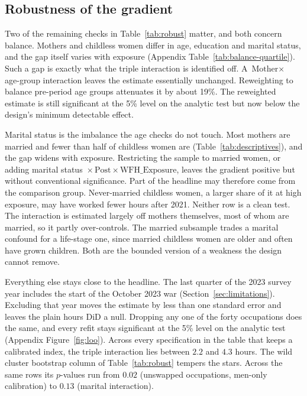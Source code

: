 \documentclass[12pt,a4paper]{article}
\newcommand{\Mother}{\text{Mother}}
\newcommand{\Post}{\text{Post}}
\newcommand{\WFH}{\text{WFH\_Exposure}}
\begin{document}
\subsection{Robustness of the gradient}\label{sec:res-robust}

Two of the remaining checks in Table~\ref{tab:robust} matter, and both concern balance. Mothers
and childless women differ in age, education and marital status, and the gap itself varies with
exposure (Appendix Table~\ref{tab:balance-quartile}). Such a gap is exactly what the triple
interaction is identified off. A $\Mother \times {}$ age-group interaction leaves the estimate
essentially unchanged. Reweighting to balance pre-period age groups attenuates it by about 19\%.
The reweighted estimate is still significant at the 5\% level on the analytic test but now below
the design's minimum detectable effect.

\noindent Marital status is the imbalance the age checks do not touch. Most mothers are married and fewer
than half of childless women are (Table~\ref{tab:descriptives}), and the gap widens with
exposure. Restricting the sample to married women, or adding marital status ${} \times \Post \times
\WFH$, leaves the gradient positive but without conventional significance. Part of the headline
may therefore come from the comparison group. Never-married childless women, a larger share of it
at high exposure, may have worked fewer hours after 2021. Neither row is a clean test. The
interaction is estimated largely off mothers themselves, most of whom are married, so it partly
over-controls. The married subsample trades a marital confound for a life-stage one, since
married childless women are older and often have grown children. Both are the bounded version of
a weakness the design cannot remove.

\noindent Everything else stays close to the headline. The last quarter of the 2023 survey year includes
the start of the October 2023 war (Section~\ref{sec:limitations}). Excluding that year moves the
estimate by less than one standard error and leaves the plain hours DiD a null. Dropping any one
of the forty occupations does the same, and every refit stays significant at the 5\% level on the
analytic test (Appendix Figure~\ref{fig:loo}). Across every specification in the table that keeps
a calibrated index, the triple interaction lies between $2.2$ and $4.3$ hours. The wild cluster
bootstrap column of Table~\ref{tab:robust} tempers the stars. Across the same rows its $p$-values
run from $0.02$ (unswapped occupations, men-only calibration) to $0.13$ (marital interaction).
\end{document}
